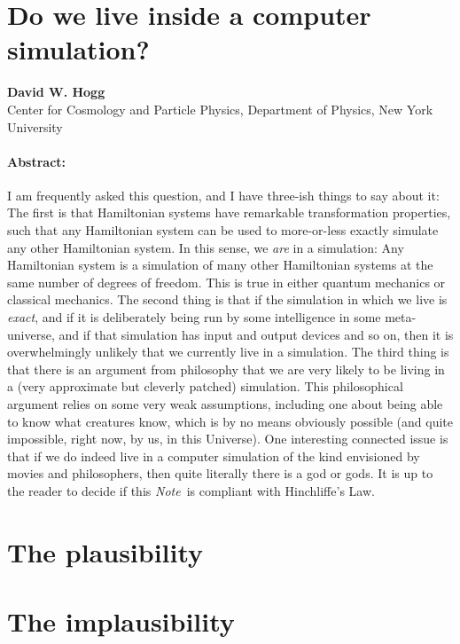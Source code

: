 \documentclass[12pt,letterpaper]{article}
\newcommand{\documentname}{\textsl{Note}}
\begin{document}
\section*{Do we live inside a computer simulation?}

\noindent
\textbf{David W. Hogg}\\
{\footnotesize{Center for Cosmology and Particle Physics, Department of Physics, New York University}}

\paragraph{Abstract:}
I am frequently asked this question, and I have three-ish things to
say about it:
The first is that Hamiltonian systems have remarkable transformation
properties, such that any Hamiltonian system can be used to
more-or-less exactly simulate any other Hamiltonian system.
In this sense, we \emph{are} in a simulation: Any Hamiltonian system
is a simulation of many other Hamiltonian systems at the same number of
degrees of freedom.
This is true in either quantum mechanics or classical mechanics.
The second thing is that if the simulation in which we live is
\emph{exact}, and if it is deliberately being run by some intelligence
in some meta-universe, and if that simulation has input and output
devices and so on, then it is overwhelmingly unlikely that we
currently live in a simulation.
The third thing is that there is an argument from philosophy that we
are very likely to be living in a (very approximate but cleverly patched) simulation.
This philosophical argument relies on some very weak assumptions,
including one about being able to know what creatures know, which is
by no means obviously possible (and quite impossible, right now, by
us, in this Universe).
One interesting connected issue is that if we do indeed live in a
computer simulation of the kind envisioned by movies and philosophers,
then quite literally there is a god or gods.
It is up to the reader to decide if this \documentname\ is compliant with
Hinchliffe's Law.

\section{The plausibility}

\section{The implausibility}
\end{document}
